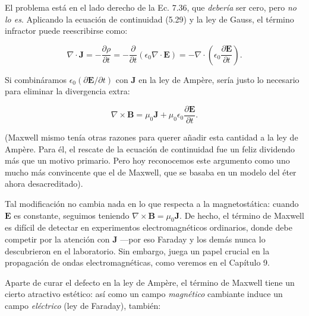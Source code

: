 \documentclass[12pt,a4paper]{report}
\newcommand{\esp}{\vspace{0.5cm}}
\begin{document}
	El problema está en el lado derecho de la Ec. 7.36, que \textit{debería} ser cero, pero \textit{no lo es}. Aplicando la ecuación de continuidad (5.29) y la ley de Gauss, el término infractor puede reescribirse como:
	
	\begin{equation*}
		\nabla \cdot \mathbf{J} = -\frac{\partial \rho}{\partial t} = -\frac{\partial}{\partial t}(\epsilon_0 \nabla \cdot \mathbf{E}) = -\nabla \cdot \left( \epsilon_0 \frac{\partial \mathbf{E}}{\partial t} \right).
	\end{equation*}
	
	Si combináramos $\epsilon_0(\partial \mathbf{E}/\partial t)$ con $\mathbf{J}$ en la ley de Ampère, sería justo lo necesario para eliminar la divergencia extra:
	
	\begin{equation}
		\nabla \times \mathbf{B} = \mu_0 \mathbf{J} + \mu_0 \epsilon_0 \frac{\partial \mathbf{E}}{\partial t}. \tag{7.37}
	\end{equation}
	
	(Maxwell mismo tenía otras razones para querer añadir esta cantidad a la ley de Ampère. Para él, el rescate de la ecuación de continuidad fue un feliz dividendo más que un motivo primario. Pero hoy reconocemos este argumento como uno mucho más convincente que el de Maxwell, que se basaba en un modelo del éter ahora desacreditado).
	
	\vspace{0.3cm}
	
	Tal modificación no cambia nada en lo que respecta a la magnetostática: cuando $\mathbf{E}$ es constante, seguimos teniendo $\nabla \times \mathbf{B} = \mu_0 \mathbf{J}$. De hecho, el término de Maxwell es difícil de detectar en experimentos electromagnéticos ordinarios, donde debe competir por la atención con $\mathbf{J}$ —por eso Faraday y los demás nunca lo descubrieron en el laboratorio. Sin embargo, juega un papel crucial en la propagación de ondas electromagnéticas, como veremos en el Capítulo 9.
	
	\vspace{0.3cm}
	
	Aparte de curar el defecto en la ley de Ampère, el término de Maxwell tiene un cierto atractivo estético: así como un campo \textit{magnético} cambiante induce un campo \textit{eléctrico} (ley de Faraday), también:
	
	\esp
	
	\begin{center}
	\end{center}
	
\end{document}
